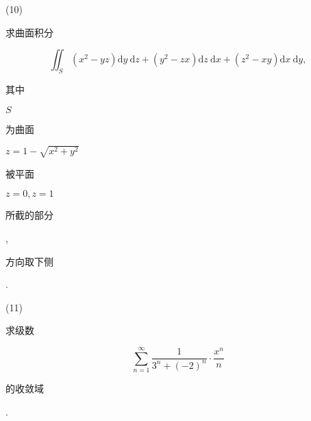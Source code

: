 \documentclass[10pt]{article}
\begin{document}
(10) \begin{CJK}{UTF8}{mj}求曲面积分\end{CJK}
$$
\iint_{S}\left(x^{2}-y z\right) \mathrm{d} y \mathrm{~d} z+\left(y^{2}-z x\right) \mathrm{d} z \mathrm{~d} x+\left(z^{2}-x y\right) \mathrm{d} x \mathrm{~d} y,
$$
\begin{CJK}{UTF8}{mj}其中\end{CJK} $S$ \begin{CJK}{UTF8}{mj}为曲面\end{CJK} $z=1-\sqrt{x^{2}+y^{2}}$ \begin{CJK}{UTF8}{mj}被平面\end{CJK} $z=0, z=1$ \begin{CJK}{UTF8}{mj}所截的部分\end{CJK}, \begin{CJK}{UTF8}{mj}方向取下侧\end{CJK}.

(11) \begin{CJK}{UTF8}{mj}求级数\end{CJK}
$$
\sum_{n=1}^{\infty} \frac{1}{3^{n}+(-2)^{n}} \cdot \frac{x^{n}}{n}
$$
\begin{CJK}{UTF8}{mj}的收敛域\end{CJK}.
\end{document}
